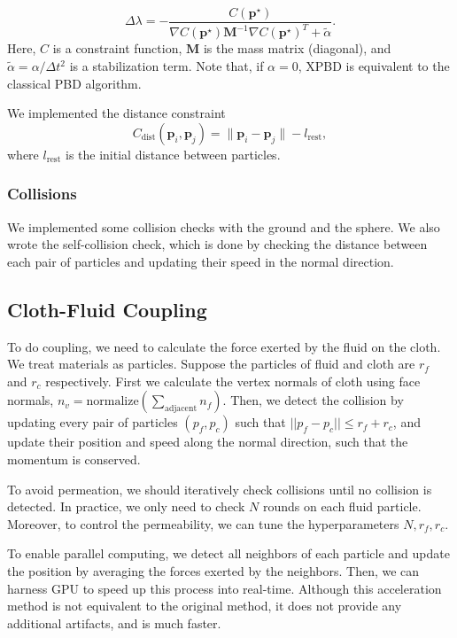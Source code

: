 \begin{equation}
  \label{eq-xpbd-3}
\Delta \lambda = -\frac{C(\mathbf{p}^\star)}{\nabla C(\mathbf{p}^\star)\mathbf{M}^{-1}\nabla C(\mathbf{p}^\star)^T + \tilde \alpha}.
\end{equation}
Here, $C$ is a constraint function, $\mathbf{M}$ is the mass matrix (diagonal), and $\tilde \alpha=\alpha/\Delta t^2$ is a stabilization term. Note that, if $\alpha=0$, XPBD is equivalent to the classical PBD algorithm.

We implemented the distance constraint
\begin{equation}
  \label{eq-xpbd-4}
C_{\text{dist}}(\mathbf{p}_i,\mathbf{p}_j)=\|\mathbf{p}_i-\mathbf{p}_j\|-l_{\text{rest}},
\end{equation}
where $l_{\text{rest}}$ is the initial distance between particles.

\subsubsection{Collisions} We implemented some collision checks with the ground and the sphere. We also wrote the self-collision check, which is done by checking the distance between each pair of particles and updating their speed in the normal direction.

\subsection{Cloth-Fluid Coupling}

To do coupling, we need to calculate the force exerted by the fluid on the cloth. We treat materials as particles. Suppose the particles of fluid and cloth are $r_f$ and $r_c$ respectively. First we calculate the vertex normals of cloth using face normals, $n_v=\text{normalize}(\sum_{\text{adjacent}} n_f)$. Then, we detect the collision by updating every pair of particles $(p_f,p_c)$ such that $||p_f-p_c||\le r_f+r_c$, and update their position and speed along the normal direction, such that the momentum is conserved.

To avoid permeation, we should iteratively check collisions until no collision is detected. In practice, we only need to check $N$ rounds on each fluid particle. Moreover, to control the permeability, we can tune the hyperparameters $N,r_f,r_c$.

To enable parallel computing, we detect all neighbors of each particle and update the position by averaging the forces exerted by the neighbors. Then, we can harness GPU to speed up this process into real-time. Although this acceleration method is not equivalent to the original method, it does not provide any additional artifacts, and is much faster.


